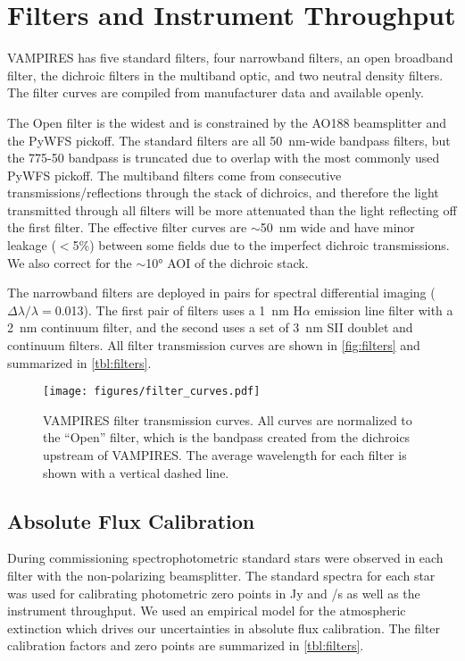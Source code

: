 \section{Filters and Instrument Throughput}\label{sec:filters}

VAMPIRES has five standard filters, four narrowband filters, an open broadband filter, the dichroic filters in the multiband optic, and two neutral density filters. The filter curves are compiled from manufacturer data and available openly. 

The Open filter is the widest and is constrained by the AO188 beamsplitter and the PyWFS pickoff. The standard filters are all \SI{50}{\nm}-wide bandpass filters, but the 775-50 bandpass is truncated due to overlap with the most commonly used PyWFS pickoff. The multiband filters come from consecutive transmissions/reflections through the stack of dichroics, and therefore the light transmitted through all filters will be more attenuated than the light reflecting off the first filter. The effective filter curves are $\sim$\SI{50}{\nm} wide and have minor leakage ($<$5\%) between some fields due to the imperfect dichroic transmissions. We also correct for the $\sim$\ang{10} AOI of the dichroic stack.

The narrowband filters are deployed in pairs for spectral differential imaging ($\Delta\lambda/\lambda=$\num{0.013}). The first pair of filters uses a \SI{1}{\nm} H$\alpha$ emission line filter with a \SI{2}{\nm} continuum filter, and the second uses a set of \SI{3}{\nm} SII doublet and continuum filters. All filter transmission curves are shown in \autoref{fig:filters} and summarized in \autoref{tbl:filters}.

\begin{figure}
    \centering
    \texttt{[image: figures/filter\_curves.pdf]}
    \caption{VAMPIRES filter transmission curves. All curves are normalized to the ``Open'' filter, which is the bandpass created from the dichroics upstream of VAMPIRES. The average wavelength for each filter is shown with a vertical dashed line.\label{fig:filters}}
\end{figure}

\subsection{Absolute Flux Calibration}

During commissioning spectrophotometric standard stars were observed in each filter with the non-polarizing beamsplitter. The standard spectra for each star was used for calibrating photometric zero points in \si{Jy} and \si{\electron/\second} as well as the instrument throughput. We used an empirical model for the atmospheric extinction \citep{buton_atmospheric_2013} which drives our uncertainties in absolute flux calibration. The filter calibration factors and zero points are summarized in \autoref{tbl:filters}.

